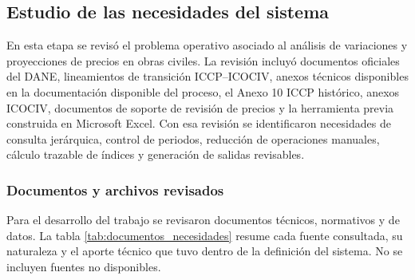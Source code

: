 \documentclass[12pt,letterpaper]{article}
\newcommand{\ICOCIV}{ICOCIV}
\newcommand{\ICCP}{ICCP}
\newcommand{\DANE}{DANE}
\begin{document}
\subsection{Estudio de las necesidades del sistema}

En esta etapa se revisó el problema operativo asociado al análisis de variaciones y proyecciones de precios en obras civiles. La revisión incluyó documentos oficiales del \DANE, lineamientos de transición \ICCP--\ICOCIV, anexos técnicos disponibles en la documentación disponible del proceso, el Anexo 10 \ICCP{} histórico, anexos \ICOCIV{}, documentos de soporte de revisión de precios y la herramienta previa construida en Microsoft Excel. Con esa revisión se identificaron necesidades de consulta jerárquica, control de periodos, reducción de operaciones manuales, cálculo trazable de índices y generación de salidas revisables.

\subsubsection{Documentos y archivos revisados}

Para el desarrollo del trabajo se revisaron documentos técnicos, normativos y de datos. La tabla \ref{tab:documentos_necesidades} resume cada fuente consultada, su naturaleza y el aporte técnico que tuvo dentro de la definición del sistema. No se incluyen fuentes no disponibles.
\end{document}
